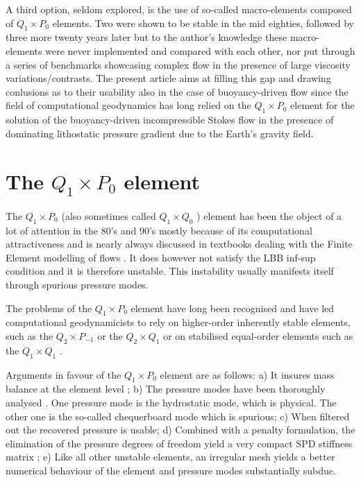 \documentclass[a4paper]{article}
\begin{document}
A third option, seldom explored, is the use of so-called macro-elements composed of $Q_1\times P_0$ elements. 
Two were shown to be stable in the mid eighties\cite{leta81,sten84}, followed by three more twenty years
later\cite{qizh07} but to the author's knowledge these macro-elements were never 
implemented and compared with each other, nor put through a series of benchmarks showcasing complex flow in the 
presence of large viscosity variations/contrasts. The present article aims at 
filling this gap and drawing conlusions as to their usability also in the case of buoyancy-driven flow
since the field of computational geodynamics has long relied on the $Q_1\times P_0$ element for the 
solution of the buoyancy-driven incompressible Stokes flow in the presence of 
dominating lithostatic pressure gradient due to the Earth's gravity field.  



\section{The $Q_1\times P_0$ element}\label{sec2}

The $Q_1\times P_0$ (also sometimes called 
$Q_1 \times Q_0$ \cite{grsa}) element has been the object of a lot of attention in the 80's and 90's
mostly because of its computational attractiveness and is nearly always discussed in 
textbooks dealing with the Finite Element modelling of flows \cite{grsa,dohu03,bobf08,bobf13}.
It does however not satisfy the LBB inf-sup condition and it is therefore unstable. 
This instability usually manifests itself through spurious pressure modes.

The problems of the $Q_1\times P_0$ element have long been recognised 
and have led computational geodynamicists to rely on 
higher-order inherently stable elements, such as the $Q_2\times P_{-1}$ \cite{mabl15} or the 
$Q_2\times Q_1$ \cite{krhb12} or on stabilised equal-order elements such as the $Q_1\times Q_1$ \cite{busa13}.

Arguments in favour of the $Q_1\times P_0$ element are as follows:
a) It insures mass balance at the element level \cite[p459]{grsa};
b) The pressure modes have been thoroughly analysed \cite{sagl81a,sagl81b,grsi94}.
One pressure mode is the hydrostatic mode, which is  
physical. The other one is the so-called chequerboard mode which is spurious;
c) When filtered out \cite{chpc95} the recovered pressure is usable;
d) Combined with a penalty formulation, the elimination of the pressure degrees of freedom 
yield a very compact SPD stiffness matrix \cite{zigo75,hulb79,zina82,redd82,odks82};
e) Like all other unstable elements, an irregular mesh yields a 
better numerical behaviour of the element \cite{qizh07} and pressure modes substantially subdue.
\end{document}
